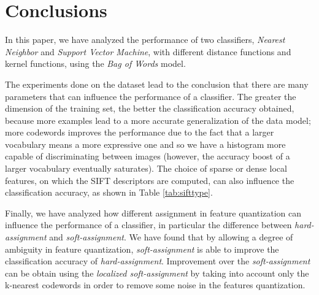 \section{Conclusions}

In this paper, we have analyzed the performance of two classifiers, \emph{Nearest Neighbor} and \emph{Support Vector Machine}, with different distance functions and kernel functions, using the \emph{Bag of Words} model. 

The experiments done on the dataset lead to the conclusion that there are many parameters that can influence the performance of a classifier.
The greater the dimension of the training set, the better the classification accuracy obtained, because more examples lead to a more accurate generalization of the data model; more codewords improves the performance due to the fact that a larger vocabulary means a more expressive one and so we have a histogram more capable of discriminating between images (however, the accuracy boost of a larger vocabulary eventually saturates\cite{Philbin08lostin}). The choice of sparse or dense local features, on which the SIFT descriptors are computed, can also influence the classification accuracy, as shown in Table \ref{tab:sifttype}.

Finally, we have analyzed how different assignment in feature quantization can influence the performance of a classifier, in particular the difference between \emph{hard-assignment} and \emph{soft-assignment}.
We have found that by allowing a degree of ambiguity in feature quantization, \emph{soft-assignment} is able to improve the classification accuracy of \emph{hard-assignment}. Improvement over the \emph{soft-assignment} can be obtain using the \emph{localized soft-assignment} by taking into account only the k-nearest codewords in order to remove some noise in the features quantization.
